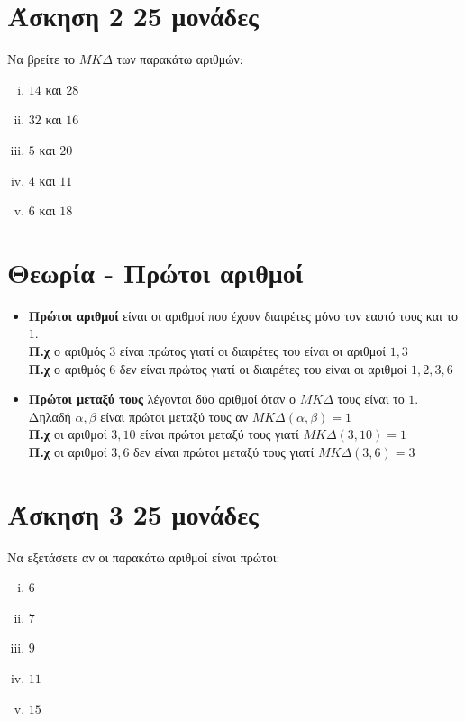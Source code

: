 \documentclass[a4paper,10pt]{report}
\begin{document}
\section*{Άσκηση 2  \hfill \small{25 μονάδες}}
Να βρείτε το $ΜΚΔ$ των παρακάτω αριθμών:
\begin{enumerate}[i)]
 \item $14$ και $28$
 \item $32$ και $16$
 \item $5$ και $20$
 \item $4$ και $11$
 \item $6$ και $18$
\end{enumerate}

\section*{Θεωρία - Πρώτοι αριθμοί \hfill \small{}}
\begin{itemize}
 \item \textbf{Πρώτοι αριθμοί} είναι οι αριθμοί που έχουν διαιρέτες μόνο τον εαυτό τους και το $1$.\\
       \textbf{Π.χ} ο αριθμός $3$ είναι πρώτος γιατί οι διαιρέτες του είναι οι αριθμοί $1,3$\\
       \textbf{Π.χ} ο αριθμός $6$ δεν είναι πρώτος γιατί οι διαιρέτες του είναι οι αριθμοί $1,2,3,6$
 \item \textbf{Πρώτοι μεταξύ τους} λέγονται δύο αριθμοί όταν ο $ΜΚΔ$ τους είναι το $1$.\\
        Δηλαδή $α,β$ είναι πρώτοι μεταξύ τους αν $ΜΚΔ(α,β)=1$\\
       \textbf{Π.χ} οι αριθμοί $3,10$ είναι πρώτοι μεταξύ τους γιατί  $ΜΚΔ(3,10)=1$\\
       \textbf{Π.χ} οι αριθμοί $3,6$ δεν είναι πρώτοι μεταξύ τους γιατί  $ΜΚΔ(3,6)=3$
\end{itemize}


\section*{Άσκηση 3  \hfill \small{}25  μονάδες}
Να εξετάσετε αν οι παρακάτω αριθμοί είναι πρώτοι:
\begin{enumerate}[i)]
 \item $6$
 \item $7$
 \item $9$
 \item $11$
 \item $15$
\end{enumerate}
\end{document}
